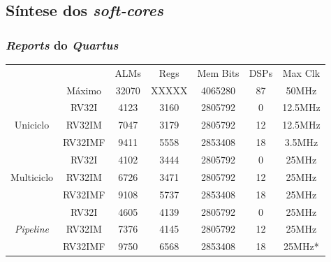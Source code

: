 \documentclass[aspectratio=169]{beamer}
\begin{document}
    \subsection{Síntese dos \textit{soft-cores}}
    \begin{frame}
        \frametitle{\textit{Reports} do \textit{Quartus}}
        \vfill
        \begin{longtable}{cc|c|c|c|c|c|}
            \cline{3-7}
                                                                    &                               & ALMs  & Regs  & Mem Bits  & DSPs  & Max Clk   \\
            \cline{2-7}
                                                                    & \multicolumn{1}{|c|}{Máximo}  & 32070 & XXXXX & 4065280   & 87    & 50MHz     \\
            \hline
            \endhead
            \multicolumn{1}{|c}{\multirow{3}{*}{{Uniciclo}}}        & \multicolumn{1}{|c|}{RV32I}   & 4123  & 3160  & 2805792   & 0     & 12.5MHz   \\*
            \cline{2-7}
            \multicolumn{1}{|c}{ }                                  & \multicolumn{1}{|c|}{RV32IM}  & 7047  & 3179  & 2805792   & 12    & 12.5MHz   \\*
            \cline{2-7}
            \multicolumn{1}{|c}{ }                                  & \multicolumn{1}{|c|}{RV32IMF} & 9411  & 5558  & 2853408   & 18    & 3.5MHz    \\
            \hline
            \multicolumn{1}{|c}{\multirow{3}{*}{{Multiciclo}}}      & \multicolumn{1}{|c|}{RV32I}   & 4102  & 3444  & 2805792   & 0     & 25MHz     \\*
            \cline{2-7}
            \multicolumn{1}{|c}{ }                                  & \multicolumn{1}{|c|}{RV32IM}  & 6726  & 3471  & 2805792   & 12    & 25MHz     \\*
            \cline{2-7}
            \multicolumn{1}{|c}{ }                                  & \multicolumn{1}{|c|}{RV32IMF} & 9108  & 5737  & 2853408   & 18    & 25MHz     \\
            \hline
            \multicolumn{1}{|c}{\multirow{3}{*}{\textit{Pipeline}}} & \multicolumn{1}{|c|}{RV32I}   & 4605  & 4139  & 2805792   & 0     & 25MHz     \\*
            \cline{2-7}
            \multicolumn{1}{|c}{ }                                  & \multicolumn{1}{|c|}{RV32IM}  & 7376  & 4145  & 2805792   & 12    & 25MHz     \\*
            \cline{2-7}
            \multicolumn{1}{|c}{ }                                  & \multicolumn{1}{|c|}{RV32IMF} & 9750  & 6568  & 2853408   & 18    & 25MHz*    \\
            \hline
        \end{longtable}
        \vfill
    \end{frame}
\end{document}
